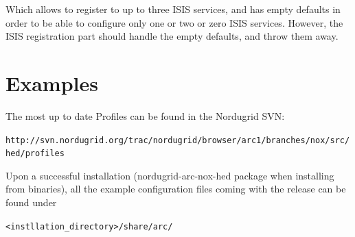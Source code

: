 \documentclass{article}
\begin{document}
Which allows to register to up to three ISIS services, and has empty defaults in order to be able to configure only one or two or zero ISIS services. However, the ISIS registration part should handle the empty defaults, and throw them away.

\section{Examples}

The most up to date Profiles can be found in the Nordugrid SVN:

\verb!http://svn.nordugrid.org/trac/nordugrid/browser/arc1/branches/nox/src/hed/profiles!

Upon a successful installation (nordugrid-arc-nox-hed package when installing from binaries), all the example configuration files coming with the release can be found under

\verb!<instllation_directory>/share/arc/!
\end{document}
